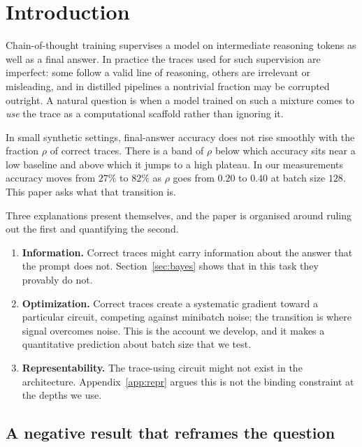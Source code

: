 \documentclass{article}
\theoremstyle{plain}
\theoremstyle{definition}
\theoremstyle{remark}
\newcommand{\1}{\mathbf{1}}
\begin{document}
\section{Introduction}
\label{sec:intro}

Chain-of-thought training supervises a model on intermediate reasoning tokens as
well as a final answer. In practice the traces used for such supervision are
imperfect: some follow a valid line of reasoning, others are irrelevant or
misleading, and in distilled pipelines a nontrivial fraction may be corrupted
outright. A natural question is when a model trained on such a mixture comes to
\emph{use} the trace as a computational scaffold rather than ignoring it.

In small synthetic settings, final-answer accuracy does not rise smoothly with
the fraction $\rho$ of correct traces. There is a band of $\rho$ below which
accuracy sits near a low baseline and above which it jumps to a high plateau. In
our measurements accuracy moves from $27\%$ to $82\%$ as $\rho$ goes from $0.20$
to $0.40$ at batch size $128$. This paper asks what that transition is.

Three explanations present themselves, and the paper is organised around ruling
out the first and quantifying the second.

\begin{enumerate}[leftmargin=*,itemsep=2pt]
\item \textbf{Information.} Correct traces might carry information about the
answer that the prompt does not. Section~\ref{sec:bayes} shows that in this task
they provably do not.
\item \textbf{Optimization.} Correct traces create a systematic gradient toward a
particular circuit, competing against minibatch noise; the transition is where
signal overcomes noise. This is the account we develop, and it makes a
quantitative prediction about batch size that we test.
\item \textbf{Representability.} The trace-using circuit might not exist in the
architecture. Appendix~\ref{app:repr} argues this is not the binding constraint
at the depths we use.
\end{enumerate}

\subsection{A negative result that reframes the question}
\end{document}
